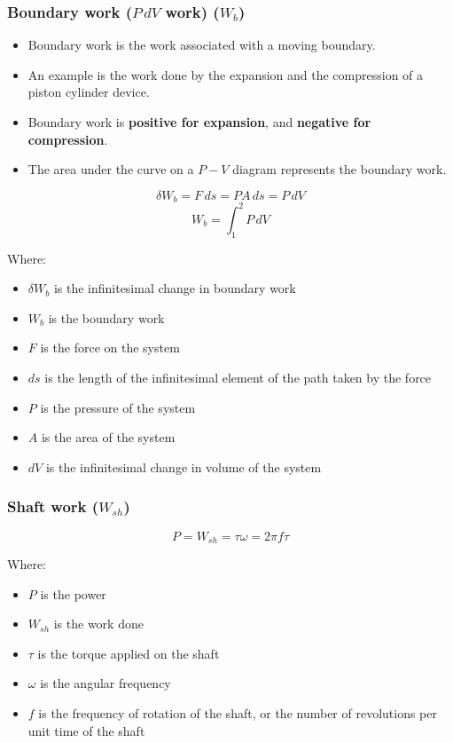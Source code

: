 \documentclass[11pt]{article}
\begin{document}
\newpage

\subsubsection{Boundary work (\(P \, dV\) work) (\(W_b\))}
\label{sec:org15bc89f}
\begin{itemize}
\item Boundary work is the work associated with a moving boundary.
\item An example is the work done by the expansion and the compression of a piston cylinder device.
\item Boundary work is \textbf{positive for expansion}, and \textbf{negative for compression}.
\item The area under the curve on a \(P - V\) diagram represents the boundary work.
\end{itemize}

\[\delta W_b = F \, ds = PA \, ds = P \, dV\]
\[W_b = \int_1^2 P \, dV\]

Where:
\begin{itemize}
\item \(\delta W_b\) is the infinitesimal change in boundary work
\item \(W_b\) is the boundary work
\item \(F\) is the force on the system
\item \(ds\) is the length of the infinitesimal element of the path taken by the force
\item \(P\) is the pressure of the system
\item \(A\) is the area of the system
\item \(dV\) is the infinitesimal change in volume of the system
\end{itemize}

\newpage

\subsubsection{Shaft work (\(W_{sh}\))}
\label{sec:orgf453075}
\[P = W_{sh} = \tau \omega = 2 \pi f \tau\]

Where:
\begin{itemize}
\item \(P\) is the power
\item \(W_{sh}\) is the work done
\item \(\tau\) is the torque applied on the shaft
\item \(\omega\) is the angular frequency
\item \(f\) is the frequency of rotation of the shaft, or the number of revolutions per unit time of the shaft
\end{itemize}
\end{document}
